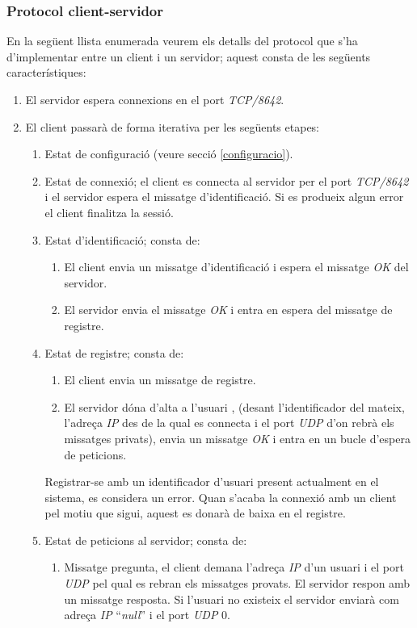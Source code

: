 \documentclass[a4paper,10pt]{article}
\begin{document}
		\subsubsection{Protocol client-servidor}
		En la següent llista enumerada veurem els detalls del protocol que s'ha d'implementar entre un client i un servidor; aquest consta de les següents característiques:
			\begin{enumerate}
			\item El servidor espera connexions en el port \emph{TCP/8642}.
			\item El client passarà de forma iterativa per les següents etapes:
				\begin{enumerate}
				\item Estat de configuració (veure secció \ref{configuracio}).
				\item Estat de connexió; el client es connecta al servidor per el port \emph{TCP/8642} i el servidor espera el missatge d'identificació. Si es produeix algun error el client finalitza la sessió.
				\item Estat d'identificació; consta de:
					\begin{enumerate}
					\item El client envia un missatge d'identificació i espera el missatge \emph{OK} del servidor.
					\item El servidor envia el missatge \emph{OK} i entra en espera del missatge de registre.
					\end{enumerate}
				\item Estat de registre; consta de:
					\begin{enumerate}
					\item El client envia un missatge de registre.
					\item El servidor dóna d'alta a l'usuari , (desant l'identificador del mateix, l'adreça \emph{IP} des de la qual es connecta i el port \emph{UDP} d'on rebrà els missatges privats), envia un missatge \emph{OK} i entra en un bucle d'espera de peticions.
					\end{enumerate}
				Registrar-se amb un identificador d'usuari present actualment en el sistema, es considera un error. Quan s'acaba la connexió amb un client pel motiu que sigui, aquest es donarà de baixa en el registre.
				\item Estat de peticions al servidor; consta de:
					\begin{enumerate}
					\item Missatge pregunta, el client demana l'adreça \emph{IP} d'un usuari i el port \emph{UDP} pel qual es rebran els missatges provats. El servidor respon amb un missatge resposta. Si l'usuari no existeix el servidor enviarà com adreça \emph{IP} ``\emph{null}'' i el port \emph{UDP} 0.

\end{enumerate}
\end{enumerate}
\end{enumerate}
\end{document}
